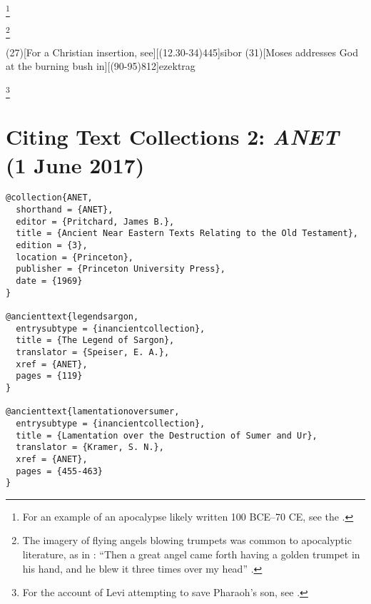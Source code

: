 \documentclass[a4paper]{article}
\begin{document}
\begin{fverbcite}{13}
  \footnote{For an example of an apocalypse likely written 100 BCE–70 CE, see
    the .}
\end{fverbcite}
\begin{fverbcite}{13}
  \footnote{The imagery of flying angels blowing trumpets was common to
    apocalyptic literature, as in : “Then a great
    angel came forth having a golden trumpet in his hand, and he blew it three
    times over my head” .}
\end{fverbcite}
\examplecite(27)[For a Christian insertion, see][(12.30-34)445]{sibor}
\examplecite(31)[Moses addresses God at the burning bush in][(90-95)812]{ezektrag}
\begin{fverbcite}{17}
  \footnote{For the account of Levi attempting to save Pharaoh’s son, see
    \cite[(29.1-6)]{josasen}.}
\end{fverbcite}
\exampleancientsources
\examplesecondarysources
{}

\section{Citing Text Collections 2: \emph{ANET} (1 June 2017)}

\begin{verbatim}
@collection{ANET,
  shorthand = {ANET},
  editor = {Pritchard, James B.},
  title = {Ancient Near Eastern Texts Relating to the Old Testament},
  edition = {3},
  location = {Princeton},
  publisher = {Princeton University Press},
  date = {1969}
}

@ancienttext{legendsargon,
  entrysubtype = {inancientcollection},
  title = {The Legend of Sargon},
  translator = {Speiser, E. A.},
  xref = {ANET},
  pages = {119}
}

@ancienttext{lamentationoversumer,
  entrysubtype = {inancientcollection},
  title = {Lamentation over the Destruction of Sumer and Ur},
  translator = {Kramer, S. N.},
  xref = {ANET},
  pages = {455-463}
}
\end{verbatim}
\end{document}
